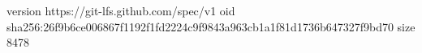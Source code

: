 version https://git-lfs.github.com/spec/v1
oid sha256:26f9b6ce006867f1192f1fd2224c9f9843a963cb1a1f81d1736b647327f9bd70
size 8478
